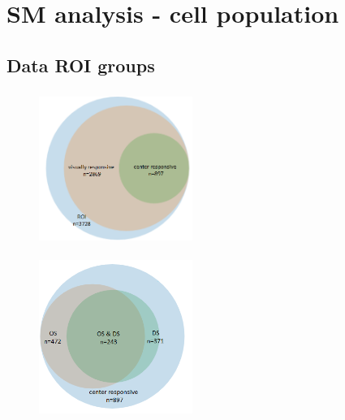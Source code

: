 \section{SM analysis - cell population}

\subsection{Data ROI groups}

\begin{figure}[H] \centering \includegraphics[width=5cm,height=5cm,keepaspectratio]{Figures/7.Results/data/ROIvisualCenter.png} 
\end{figure}

\begin{figure}[H] \centering \includegraphics[width=5cm,height=5cm,keepaspectratio]{Figures/7.Results/data/centerOSDS.png} 
\end{figure}

